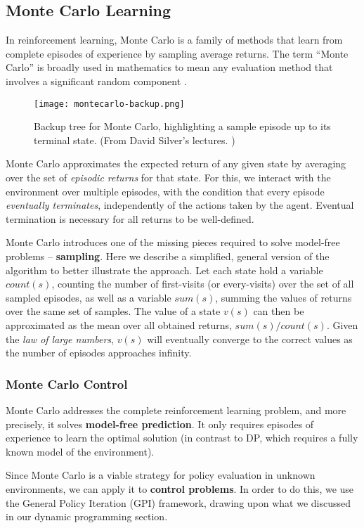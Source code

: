 \subsection{Monte Carlo Learning} \label{rl:mc}
In reinforcement learning, Monte Carlo is a family of methods that learn from complete episodes of experience by sampling average returns.
The term “Monte Carlo” is broadly used in mathematics to mean any evaluation method that involves a significant random component \cite{rlai}.

\begin{figure}[ht]
    \caption{Backup tree for Monte Carlo, highlighting a sample episode up to its terminal state. (From David Silver's lectures. \cite{silver-lectures})}
    \centering
    \texttt{[image: montecarlo-backup.png]}
\end{figure}

Monte Carlo approximates the expected return of any given state by averaging over the set of \emph{episodic returns} for that state.
For this, we interact with the environment over multiple episodes, with the condition that every episode \emph{eventually terminates}, independently of the actions taken by the agent.
Eventual termination is necessary for all returns to be well-defined.

Monte Carlo introduces one of the missing pieces required to solve model-free problems -- \textbf{sampling}.
Here we describe a simplified, general version of the algorithm to better illustrate the approach.
Let each state hold a variable $count(s)$, counting the number of first-visits (or every-visits) over the set of all sampled episodes, as well as a variable $sum(s)$, summing the values of returns over the same set of samples.
The value of a state $v(s)$ can then be approximated as the mean over all obtained returns, $sum(s) / count(s)$.
Given the \emph{law of large numbers}, $v(s)$ will eventually converge to the correct values as the number of episodes approaches infinity.

\subsubsection{Monte Carlo Control}
Monte Carlo addresses the complete reinforcement learning problem, and more precisely, it solves \textbf{model-free prediction}.
It only requires episodes of experience to learn the optimal solution (in contrast to DP, which requires a fully known model of the environment).

Since Monte Carlo is a viable strategy for policy evaluation in unknown environments, we can apply it to \textbf{control problems}.
In order to do this, we use the General Policy Iteration (GPI) framework, drawing upon what we discussed in our dynamic programming section.

